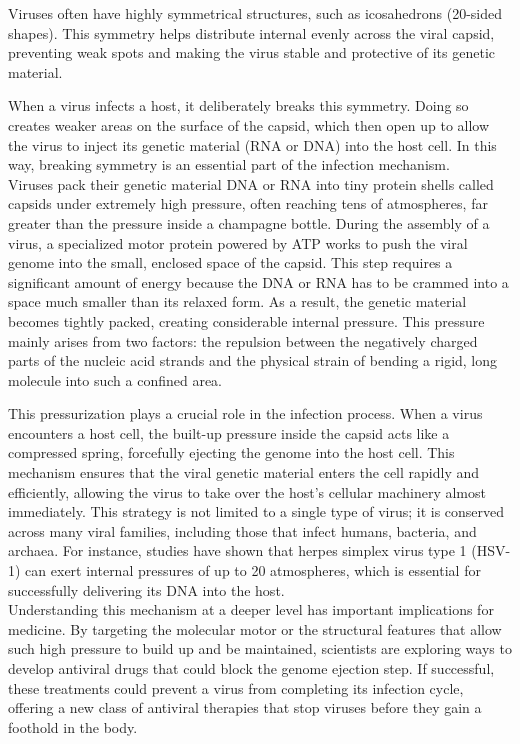 \documentclass[12pt]{article}
\begin{document}
\begin{flushleft}
Viruses often have highly symmetrical structures, such as icosahedrons (20-sided shapes). This symmetry helps distribute internal evenly across the viral capsid, preventing weak spots and making the virus stable and protective of its genetic material.

When a virus infects a host, it deliberately breaks this symmetry. Doing so creates weaker areas on the surface of the capsid, which then open up to allow the virus to inject its genetic material (RNA or DNA) into the host cell. In this way, breaking symmetry is an essential part of the infection mechanism.\\




Viruses pack their genetic material DNA or RNA into tiny protein shells called capsids under extremely high pressure, often reaching tens of atmospheres, far greater than the pressure inside a champagne bottle. During the assembly of a virus, a specialized motor protein powered by ATP works to push the viral genome into the small, enclosed space of the capsid. This step requires a significant amount of energy because the DNA or RNA has to be crammed into a space much smaller than its relaxed form. As a result, the genetic material becomes tightly packed, creating considerable internal pressure. This pressure mainly arises from two factors: the repulsion between the negatively charged parts of the nucleic acid strands and the physical strain of bending a rigid, long molecule into such a confined area.\cite{BrandarizNunez2019}




This pressurization plays a crucial role in the infection process. When a virus encounters a host cell, the built-up pressure inside the capsid acts like a compressed spring, forcefully ejecting the genome into the host cell. This mechanism ensures that the viral genetic material enters the cell rapidly and efficiently, allowing the virus to take over the host’s cellular machinery almost immediately. This strategy is not limited to a single type of virus; it is conserved across many viral families, including those that infect humans, bacteria, and archaea. For instance, studies have shown that herpes simplex virus type 1 (HSV-1) can exert internal pressures of up to 20 atmospheres, which is essential for successfully delivering its DNA into the host.\\




Understanding this mechanism at a deeper level has important implications for medicine. By targeting the molecular motor or the structural features that allow such high pressure to build up and be maintained, scientists are exploring ways to develop antiviral drugs that could block the genome ejection step. If successful, these treatments could prevent a virus from completing its infection cycle, offering a new class of antiviral therapies that stop viruses before they gain a foothold in the body. 





\end{flushleft}
\end{document}
